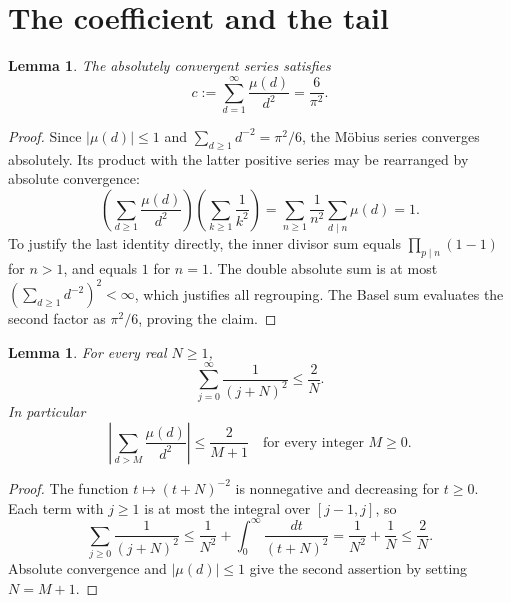 \documentclass[11pt]{article}
\newtheorem{lemma}[theorem]{Lemma}
\begin{document}
\section{The coefficient and the tail}
\begin{lemma}\label{lem:coefficient}
The absolutely convergent series satisfies
\[
c:=\sum_{d=1}^{\infty}\frac{\mu(d)}{d^2}=\frac6{\pi^2}.
\]
\end{lemma}
\begin{proof}
Since $|\mu(d)|\leq1$ and $\sum_{d\geq1}d^{-2}=\pi^2/6$,
the M\"obius series converges absolutely. Its product with the latter
positive series may be rearranged by absolute convergence:
\[
\left(\sum_{d\geq1}\frac{\mu(d)}{d^2}\right)
\left(\sum_{k\geq1}\frac1{k^2}\right)
=\sum_{n\geq1}\frac1{n^2}\sum_{d\mid n}\mu(d)=1.
\]
To justify the last identity directly, the inner divisor sum equals
$\prod_{p\mid n}(1-1)$ for $n>1$, and equals $1$ for $n=1$.
The double absolute sum is at most
$(\sum_{d\geq1}d^{-2})^2<\infty$, which justifies all regrouping.
The Basel sum evaluates the second factor as $\pi^2/6$, proving the claim.
\end{proof}

\begin{lemma}\label{lem:tail}
For every real $N\geq1$,
\[
\sum_{j=0}^{\infty}\frac1{(j+N)^2}\leq\frac2N.
\]
In particular
\[
\left|\sum_{d>M}\frac{\mu(d)}{d^2}\right|\leq\frac2{M+1}
\quad\text{for every integer }M\geq0.
\]
\end{lemma}
\begin{proof}
The function $t\mapsto(t+N)^{-2}$ is nonnegative and decreasing for
$t\geq0$. Each term with $j\geq1$ is at most the integral over
$[j-1,j]$, so
\[
\sum_{j\geq0}\frac1{(j+N)^2}
\leq\frac1{N^2}+\int_0^\infty\frac{dt}{(t+N)^2}
=\frac1{N^2}+\frac1N\leq\frac2N.
\]
Absolute convergence and $|\mu(d)|\leq1$ give the second assertion by
setting $N=M+1$.
\end{proof}
\end{document}
